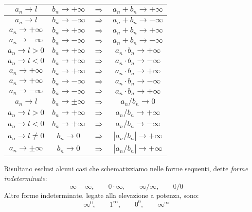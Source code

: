 \documentclass{article}
\begin{document}
\begin{center}
    \begin{tabular}{|c|c|c|c|}
        \hline
        $a_n \to l$          & $b_n\to +\infty$   & $\Rightarrow$ & $a_n + b_n \to +\infty$     \\
        \hline
        $a_n \to l$          & $b_n\to -\infty$   & $\Rightarrow$ & $a_n + b_n \to -\infty$     \\
        \hline
        $a_n \to +\infty$    & $b_n\to +\infty$   & $\Rightarrow$ & $a_n + b_n \to +\infty$     \\
        \hline
        $a_n \to -\infty$    & $b_n\to -\infty$   & $\Rightarrow$ & $a_n + b_n \to -\infty$     \\
        \hline
        $a_n \to l>0$        & $b_n\to +\infty$   & $\Rightarrow$ & $a_n \cdot b_n \to +\infty$ \\
        \hline
        $a_n \to l<0$        & $b_n\to +\infty$   & $\Rightarrow$ & $a_n \cdot b_n \to -\infty$ \\
        \hline
        $a_n \to +\infty$    & $b_n\to +\infty$   & $\Rightarrow$ & $a_n \cdot b_n \to +\infty$ \\
        \hline
        $a_n \to +\infty$    & $b_n\to -\infty$   & $\Rightarrow$ & $a_n \cdot b_n \to -\infty$ \\
        \hline
        $a_n \to -\infty$    & $b_n\to -\infty$   & $\Rightarrow$ & $a_n \cdot b_n \to +\infty$ \\
        \hline
        $a_n \to l$          & $b_n\to \pm\infty$ & $\Rightarrow$ & $a_n/b_n \to 0$             \\
        \hline
        $a_n \to l>0$        & $b_n\to +\infty$   & $\Rightarrow$ & $a_n/b_n \to +\infty$       \\
        \hline
        $a_n \to l<0$        & $b_n\to +\infty$   & $\Rightarrow$ & $a_n/b_n \to -\infty$       \\
        \hline
        $a_n \to l\neq0$     & $b_n\to 0$         & $\Rightarrow$ & $|a_n/b_n| \to +\infty$     \\
        \hline
        $a_n \to \pm \infty$ & $b_n\to 0$         & $\Rightarrow$ & $|a_n/b_n| \to +\infty$     \\
        \hline
    \end{tabular}
\end{center}
Risultano esclusi alcuni casi che schematizziamo nelle forme sequenti, dette \textit{forme indeterminate}:\\
\[\infty-\infty,\qquad 0\cdot\infty,\qquad \infty/\infty,\qquad 0/0\]
Altre forme indeterminate, legate alla elevazione a potenza, sono:
\[\infty^0,\qquad 1^\infty,\qquad 0^0,\qquad \infty^\infty\]
\end{document}
